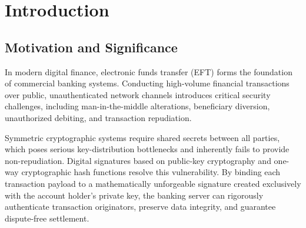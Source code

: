 \documentclass[11pt,a4paper]{article}
\begin{document}
\tableofcontents
\newpage

\section{Introduction}

\subsection{Motivation and Significance}
In modern digital finance, electronic funds transfer (EFT) forms the foundation of commercial banking systems. Conducting high-volume financial transactions over public, unauthenticated network channels introduces critical security challenges, including man-in-the-middle alterations, beneficiary diversion, unauthorized debiting, and transaction repudiation. 

Symmetric cryptographic systems require shared secrets between all parties, which poses serious key-distribution bottlenecks and inherently fails to provide non-repudiation. Digital signatures based on public-key cryptography and one-way cryptographic hash functions resolve this vulnerability. By binding each transaction payload to a mathematically unforgeable signature created exclusively with the account holder's private key, the banking server can rigorously authenticate transaction originators, preserve data integrity, and guarantee dispute-free settlement.
\end{document}
